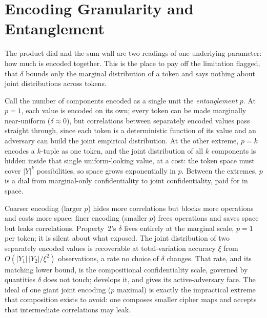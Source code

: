 \section{Encoding Granularity and Entanglement}
\label{sec:granularity}

The product dial and the sum wall are two readings of one underlying
parameter: how much is encoded together. This is the place to pay off the
limitation  flagged, that $\delta$ bounds only the
marginal distribution of a token and says nothing about joint distributions
across tokens.

Call the number of components encoded as a single unit the
\emph{entanglement} $p$. At $p = 1$, each value is encoded on its own; every
token can be made marginally near-uniform ($\delta \approx 0$), but
correlations between separately encoded values pass straight through, since
each token is a deterministic function of its value and an adversary can
build the joint empirical distribution. At the other extreme, $p = k$
encodes a $k$-tuple as one token, and the joint distribution of all $k$
components is hidden inside that single uniform-looking value, at a cost: the
token space must cover $\lvert Y\rvert^{k}$ possibilities, so space grows
exponentially in $p$. Between the extremes, $p$ is a dial from
marginal-only confidentiality to joint confidentiality, paid for in space.

\begin{remark}
\label{rem:granularity}
Coarser encoding (larger $p$) hides more correlations but blocks more
operations and costs more space; finer encoding (smaller $p$) frees
operations and saves space but leaks correlations. Property~2's $\delta$
lives entirely at the marginal scale, $p = 1$ per token; it is silent about
what  exposed. The joint distribution of two
separately encoded values is recoverable at total-variation accuracy $\xi$
from $O(\lvert Y_1\rvert\,\lvert Y_2\rvert / \xi^2)$ observations, a rate no
choice of $\delta$ changes. That rate, and its matching lower bound, is the
compositional confidentiality scale, governed by quantities $\delta$ does
not touch;  develops it, and 
gives its active-adversary face. The ideal of one giant joint encoding ($p$
maximal) is exactly the impractical extreme that composition exists to
avoid: one composes smaller cipher maps and accepts that intermediate
correlations may leak.
\end{remark}

